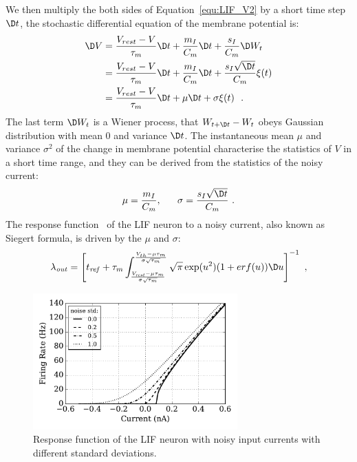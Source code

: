 	We then multiply the both sides of Equation~\ref{equ:LIF_V2} by a short time step $\D t$, the stochastic differential equation of the membrane potential is: %
	\begin{equation}
	\begin{aligned}
	\D V&= \frac{V_{rest} - V}{\tau_m }\D t + \frac{m_I}{C_m} \D t + \frac{s_I}{C_m}  \D W_t \\
	&=\frac{V_{rest} - V}{\tau_m }\D t + \frac{m_I}{C_m} \D t + \frac{s_I \sqrt{\D t}}{C_m} \xi(t)  \\
	&=\frac{V_{rest} - V}{\tau_m }\D t + \mu \D t + \sigma \xi(t) ~~. 
	\end{aligned}
	\end{equation}	
	The last term $\D W_t$ is a Wiener process, that $W_{t +\D t} - W_{t}$ obeys Gaussian distribution with mean 0 and variance $\D t$.
	The instantaneous mean $\mu$ and variance $\sigma^2$ of the change in membrane potential characterise the statistics of $V$ in a short time range, and they can be derived from the statistics of the noisy current:
	\begin{equation}
	\mu =\dfrac{m_I}{C_m}, ~~~~~ \sigma = \dfrac{s_I \sqrt{\D t}}{C_m}~.
	\end{equation}
	The response function~\citep{rauch2003neocortical,la2008response} of the LIF neuron to a noisy current, also known as Siegert formula, is driven by the $\mu$ and $\sigma$:
	\begin{equation}
	\lambda_\mathit{out}=
	\left [ t_\mathit{ref}+\tau_m \int_{\frac{V_\mathit{rest}-\mu \tau_m }{\sigma \sqrt{\tau_m}}}^{\frac{V_{th}-\mu \tau_m }{\sigma \sqrt{\tau_m}}} \sqrt{\pi} \exp(u^{2}) (1+erf(u)) \D u \right ]^{-1} ~,
	\label{equ:siegert}
	\end{equation}
	

	
	\begin{figure}[bt]
		\centering
		\includegraphics[width=0.7\textwidth]{pics_iconip/1.pdf}
		\caption{Response function of the LIF neuron with noisy input currents with different standard deviations.}
		\label{Fig:physics}
	\end{figure}
	
